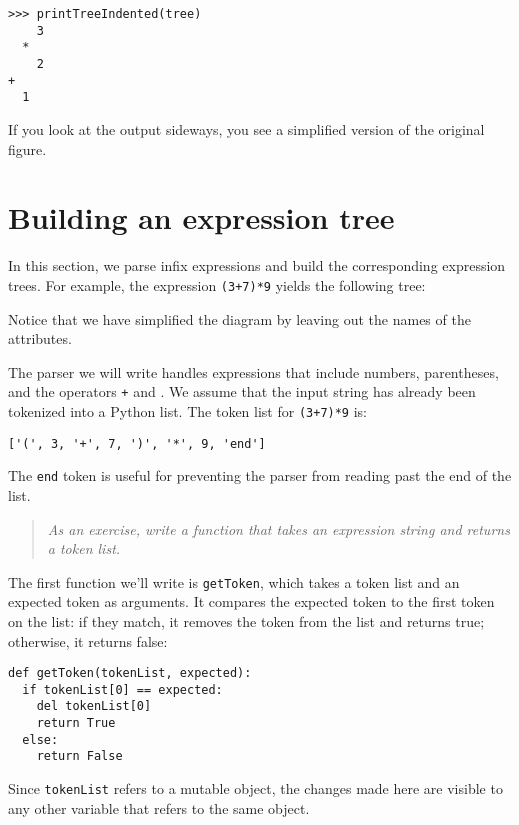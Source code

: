 \beforeverb
\begin{verbatim}
>>> printTreeIndented(tree)
    3
  *
    2
+
  1
\end{verbatim}
\afterverb
%
If you look at the output sideways, you see a simplified version
of the original figure.



\section{Building an expression tree}

In this section, we parse infix expressions and build the
corresponding expression trees.  For example, the expression
{\tt (3+7)*9} yields the following tree:

\beforefig
\centerline{}
\afterfig

Notice that we have simplified the diagram by leaving
out the names of the attributes.

The parser we will write handles expressions that include numbers,
parentheses, and the operators {\tt +} and {\tt *}.
We assume that the input string has already
been tokenized into a Python list.  The token list for
{\tt (3+7)*9} is:

\beforeverb
\begin{verbatim}
['(', 3, '+', 7, ')', '*', 9, 'end']
\end{verbatim}
\afterverb
%
The {\tt end} token is useful for preventing the parser from
reading past the end of the list.

\begin{quote}
{\em As an exercise, write a function that takes an expression
string and returns a token list.}
\end{quote}

The first function we'll write is {\tt getToken}, which takes a token
list and an expected token as arguments.  It compares the expected
token to the first token on the list: if they match, it removes the
token from the list and returns true; otherwise, it returns false:

\beforeverb
\begin{verbatim}
def getToken(tokenList, expected):
  if tokenList[0] == expected:
    del tokenList[0]
    return True
  else:
    return False
\end{verbatim}
\afterverb
%
Since {\tt tokenList} refers to a mutable object, the changes made
here are visible to any other variable that refers to the same object.

